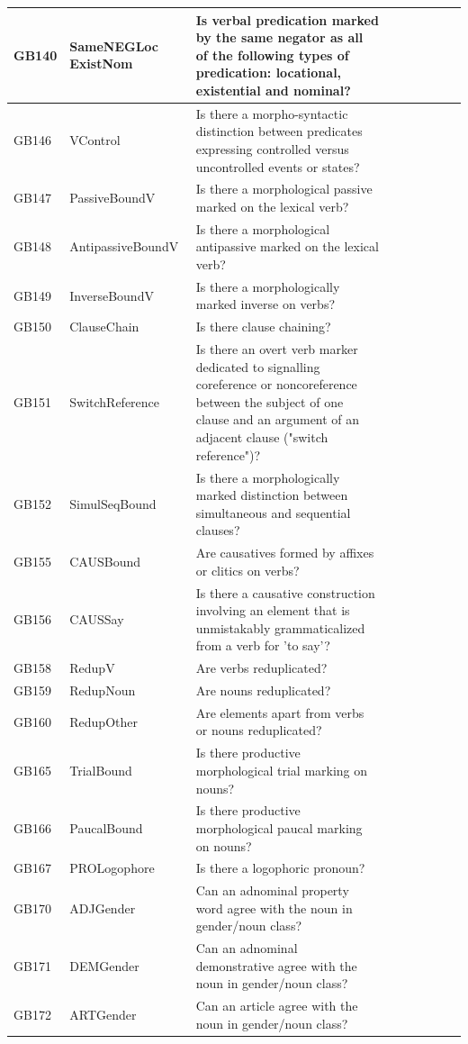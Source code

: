 \documentclass[draft,10pt]{article} %
\begin{document}
\begin{landscape}
\begin{longtable}{| l | p{4cm}| p{12cm}|p{2cm}|p{2cm}|p{2cm}|p{2cm}|p{2cm}|p{2cm}|}
GB140 & SameNEGLoc ExistNom&Is verbal predication marked by the same negator as all of the following types of predication: locational, existential and nominal?\\ \hline
GB146 & VControl&Is there a morpho-syntactic distinction between predicates expressing controlled versus uncontrolled events or states?\\ \hline
GB147 & PassiveBoundV&Is there a morphological passive marked on the lexical verb?\\ \hline
GB148 & AntipassiveBoundV&Is there a morphological antipassive marked on the lexical verb?\\ \hline
GB149 & InverseBoundV&Is there a morphologically marked inverse on verbs?\\ \hline
GB150 & ClauseChain&Is there clause chaining?\\ \hline
GB151 & SwitchReference&Is there an overt verb marker dedicated to signalling coreference or noncoreference between the subject of one clause and an argument of an adjacent clause ("switch reference")?\\ \hline
GB152 & SimulSeqBound&Is there a morphologically marked distinction between simultaneous and sequential clauses?\\ \hline
GB155 & CAUSBound&Are causatives formed by affixes or clitics on verbs?\\ \hline
GB156 & CAUSSay&Is there a causative construction involving an element that is unmistakably grammaticalized from a verb for 'to say'?\\ \hline
GB158 & RedupV&Are verbs reduplicated?\\ \hline
GB159 & RedupNoun&Are nouns reduplicated?\\ \hline
GB160 & RedupOther&Are elements apart from verbs or nouns reduplicated?\\ \hline
GB165 & TrialBound&Is there productive morphological trial marking on nouns?\\ \hline
GB166 & PaucalBound&Is there productive morphological paucal marking on nouns?\\ \hline
GB167 & PROLogophore&Is there a logophoric pronoun?\\ \hline
GB170 & ADJGender&Can an adnominal property word agree with the noun in gender/noun class?\\ \hline
GB171 & DEMGender&Can an adnominal demonstrative agree with the noun in gender/noun class?\\ \hline
GB172 & ARTGender&Can an article agree with the noun in gender/noun class?\\ \hline

\end{longtable}
\end{landscape}
\end{document}
